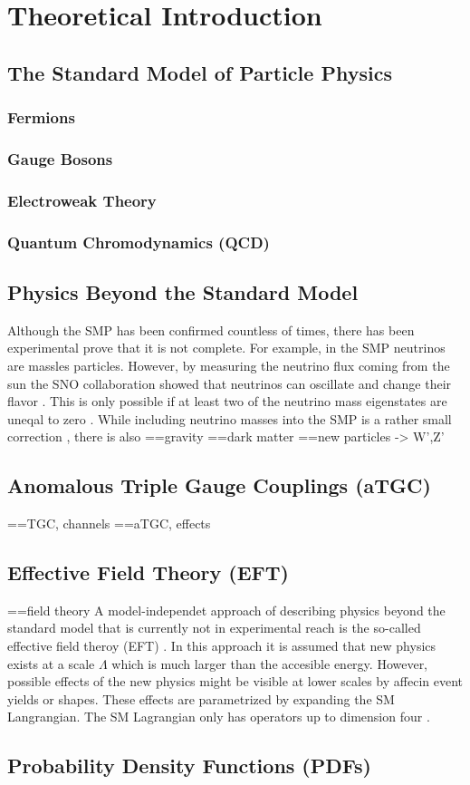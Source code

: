 \chapter{Theoretical Introduction}
\label{chap::TheoreticalIntroduction}

\section{The Standard Model of Particle Physics}
\subsection{Fermions}
\subsection{Gauge Bosons}
\subsection{Electroweak Theory}
\subsection{Quantum Chromodynamics (QCD)}
\section{Physics Beyond the Standard Model}
Although the SMP has been confirmed countless of times, there has been experimental prove that it is not complete. For example, in the SMP neutrinos are massles particles. However, by measuring the neutrino flux coming from the sun the SNO collaboration showed that neutrinos can oscillate and change their flavor \cite{SNO}. This is only possible if at least two of the neutrino mass eigenstates are uneqal to zero \cite{}. While including neutrino masses into the SMP is a rather small correction \cite{numassesSMP}, there is also 
==gravity
==dark matter
==new particles -> W',Z'
\section{Anomalous Triple Gauge Couplings (aTGC)}
==TGC, channels
==aTGC, effects
\section{Effective Field Theory (EFT)}
==field theory
A model-independet approach of describing physics beyond the standard model that is currently not in experimental reach is the so-called effective field theroy (EFT) \cite{EFT}. In this approach it is assumed that new physics exists at a scale $\Lambda$ which is much larger than the accesible energy. However, possible effects of the new physics might be visible at lower scales by affecin event yields or shapes. These effects are parametrized by expanding the SM Langrangian. The SM Lagrangian only has operators up to dimension four \cite{}. 
\section{Probability Density Functions (PDFs)}